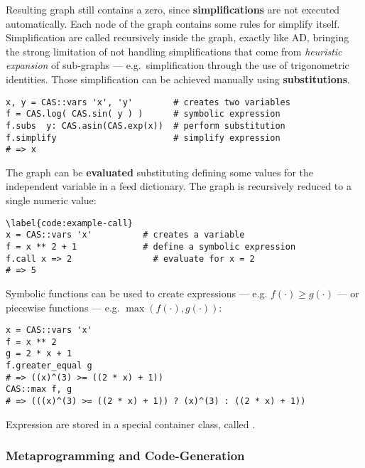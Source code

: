 Resulting graph still contains a zero, since \textbf{simplifications} are not executed automatically. Each node of the graph contains some rules for simplify itself. Simplification are called recursively inside the graph, exactly like AD, bringing the strong limitation of not handling simplifications that come from \emph{heuristic expansion} of sub-graphs --- e.g.\ simplification through the use of trigonometric identities. Those simplification can be achieved manually using \textbf{substitutions}.
\begin{lstlisting}[caption={Simplification example},label={code:example-simp}]
x, y = CAS::vars 'x', 'y'        # creates two variables
f = CAS.log( CAS.sin( y ) )      # symbolic expression
f.subs  y: CAS.asin(CAS.exp(x))  # perform substitution
f.simplify                       # simplify expression
# => x
\end{lstlisting}

The graph can be \textbf{evaluated} substituting defining some values for the independent variable in a feed dictionary. The graph is recursively reduced to a single numeric value:
\begin{lstlisting}[caption={Graph evaluation example},label={code:example-call}]
\label{code:example-call}
x = CAS::vars 'x'          # creates a variable
f = x ** 2 + 1             # define a symbolic expression
f.call x => 2                # evaluate for x = 2
# => 5
\end{lstlisting}

Symbolic functions can be used to create expressions --- e.g. $f(\cdot) \geq g(\cdot)$ --- or piecewise functions --- e.g. $\max(f(\cdot), g(\cdot))$:
\begin{lstlisting}[caption={Expressions and Piecewise functions},label={code:example-expr}]
x = CAS::vars 'x'
f = x ** 2
g = 2 * x + 1
f.greater_equal g
# => ((x)^(3) >= ((2 * x) + 1))
CAS::max f, g
# => (((x)^(3) >= ((2 * x) + 1)) ? (x)^(3) : ((2 * x) + 1))
\end{lstlisting}
Expression are stored in a special container class, called \CASExpression.

\subsubsection{Metaprogramming and Code-Generation}

